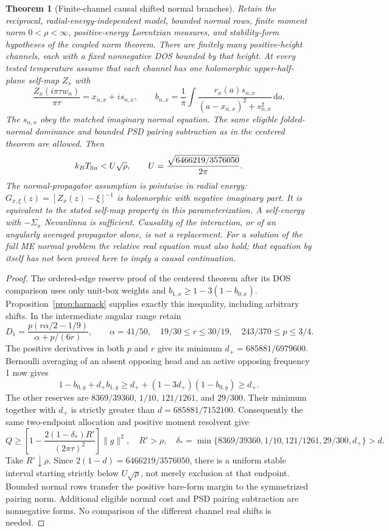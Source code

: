 \documentclass[11pt]{article}
\newtheorem{theorem}{Theorem}
\newcommand{\dd}{\,\mathrm{d}}
\newcommand{\Tlin}{T_{\rm lin}}
\begin{document}
\begin{theorem}[Finite-channel causal shifted normal branches]\label{thm:causal-shift}
Retain the reciprocal, radial-energy-independent model, bounded normal rows, finite moment norm $0<\rho<\infty$, positive-energy Lorentzian measures, and stability-form hypotheses of the coupled norm theorem. There are finitely many positive-height channels, each with a fixed nonnegative DOS bounded by that height. At every tested temperature assume that each channel has one holomorphic upper-half-plane self-map $Z_x$ with
\[
 \frac{Z_x(i\pi\tau w_n)}{\pi\tau}=x_{n,x}+is_{n,x},\qquad
 b_{n,x}=\frac1\pi\int\frac{r_x(a)s_{n,x}}{(a-x_{n,x})^2+s_{n,x}^2}\dd a.
\]
The $s_{n,x}$ obey the matched imaginary normal equation. The same eligible folded-normal dominance and bounded PSD pairing subtraction as in the centered theorem are allowed. Then
\[
 k_B\Tlin<U\sqrt\rho,\qquad U=\frac{\sqrt{6466219/3576050}}{2\pi}.
\]
The normal-propagator assumption is pointwise in radial energy: $G_{x,\xi}(z)=[Z_x(z)-\xi]^{-1}$ is holomorphic with negative imaginary part. It is equivalent to the stated self-map property in this parameterization. A self-energy with $-\Sigma_x$ Nevanlinna is sufficient. Causality of the interaction, or of an angularly averaged propagator alone, is not a replacement. For a solution of the full ME normal problem the relative real equation must also hold; that equation by itself has not been proved here to imply a causal continuation.
\end{theorem}
\begin{proof}
The ordered-edge reserve proof of the centered theorem after its DOS comparison uses only unit-box weights and $b_{1,x}\ge1-3(1-b_{0,x})$. Proposition~\ref{prop:harnack} supplies exactly this inequality, including arbitrary shifts. In the intermediate angular range retain
\[
 D_1=\frac{p(r\alpha/2-1/9)}{\alpha+p/(6r)},\qquad
 \alpha=41/50,\quad 19/30\le r\le30/19,\quad243/370\le p\le3/4.
\]
The positive derivatives in both $p$ and $r$ give its minimum $d_+=685881/6979600$. Bernoulli averaging of an absent opposing head and an active opposing frequency 1 now gives
\[
 1-b_{0,y}+d_+b_{1,y}\ge d_++(1-3d_+)(1-b_{0,y})\ge d_+.
\]
The other reserves are $8369/39360$, $1/10$, $121/1261$, and $29/300$. Their minimum together with $d_+$ is strictly greater than $d=685881/7152100$. Consequently the same two-endpoint allocation and positive moment resolvent give
\[
 Q\ge\left[1-\frac{2(1-\delta_*)R'}{(2\pi\tau)^2}\right]\|g\|^2,
 \quad R'>\rho,\quad
 \delta_*=\min\{8369/39360,1/10,121/1261,29/300,d_+\}>d.
\]
Take $R'\downarrow\rho$. Since $2(1-d)=6466219/3576050$, there is a uniform stable interval starting strictly below $U\sqrt\rho$, not merely exclusion at that endpoint. Bounded normal rows transfer the positive bare-form margin to the symmetrized pairing norm. Additional eligible normal cost and PSD pairing subtraction are nonnegative forms. No comparison of the different channel real shifts is needed.
\end{proof}
\end{document}
